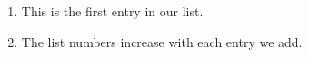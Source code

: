 \documentclass{article}
\begin{document}
\begin{enumerate}
    \item This is the first entry in our list.
    \item The list numbers increase with each entry we add.
\end{enumerate}
\end{document}
